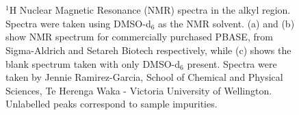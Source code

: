 \documentclass[
  a4paper,
]{scrbook}
\begin{document}
\begin{figure}
\begin{minipage}[t]{0.03\linewidth}
{\centering 


}

\end{minipage}%
%
\begin{minipage}[t]{0.01\linewidth}

{\centering 

~

}

\end{minipage}%
%
\begin{minipage}[t]{0.92\linewidth}

{\centering 


}

\end{minipage}%
%
\begin{minipage}[t]{0.04\linewidth}

{\centering 

~

}

\end{minipage}%

\caption[\(^{1}\)H Nuclear Magnetic Resonance (NMR) spectra of
commercially purchased PBASE in the alkyl region, using DMSO-d\(_6\) as
the NMR solvent.]{\label{fig-pbase-nmr}\(^{1}\)H Nuclear Magnetic
Resonance (NMR) spectra in the alkyl region. Spectra were taken using
DMSO-d\(_6\) as the NMR solvent. (a) and (b) show NMR spectrum for
commercially purchased PBASE, from Sigma-Aldrich and Setareh Biotech
respectively, while (c) shows the blank spectrum taken with only
DMSO-d\(_6\) present. Spectra were taken by Jennie Ramirez-Garcia,
School of Chemical and Physical Sciences, Te Herenga Waka - Victoria
University of Wellington. Unlabelled peaks correspond to sample
impurities.}

\end{figure}
\end{document}
